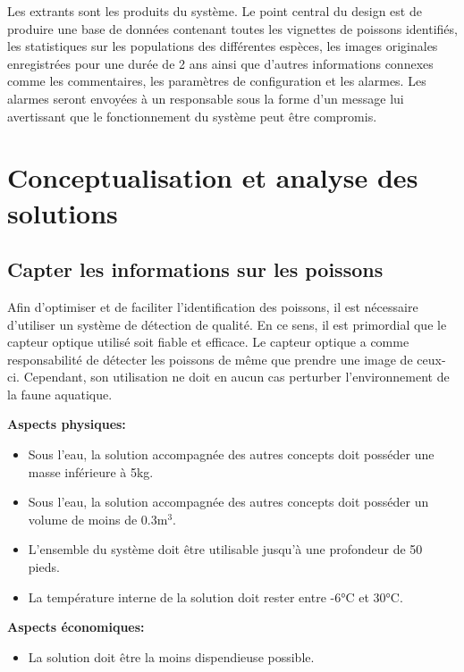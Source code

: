Les extrants sont les produits du système. Le point central du design est de produire une base de données contenant toutes les vignettes de poissons identifiés, les statistiques sur les populations des différentes espèces, les images originales enregistrées pour une durée de 2 ans ainsi que d'autres informations connexes comme les commentaires, les paramètres de configuration et les alarmes. Les alarmes seront envoyées à un responsable sous la forme d'un message lui avertissant que le fonctionnement du système peut être compromis.


\section{Conceptualisation et analyse des solutions}

\subsection{Capter les informations sur les poissons}

Afin d'optimiser et de faciliter l'identification des poissons, il est nécessaire d'utiliser un système de détection de qualité. En ce sens, il est primordial que le capteur optique utilisé soit fiable et efficace. Le capteur optique a comme responsabilité de détecter les poissons de même que prendre une image de ceux-ci. Cependant, son utilisation ne doit en aucun cas perturber l'environnement de la faune aquatique.


\textbf{Aspects physiques:}
\begin{itemize}[label = {--}]
    \item Sous l'eau, la solution accompagnée des autres concepts doit posséder une masse inférieure à 5kg.
    \item Sous l'eau, la solution accompagnée des autres concepts doit posséder un volume de moins de 0.3m$^3$.
    \item L'ensemble du système doit être utilisable jusqu'à une profondeur de 50 pieds.
    \item La température interne de la solution doit rester entre -6°C et 30°C.
\end{itemize}

\textbf{Aspects économiques:}
\begin{itemize}[label = {--}]
    \item La solution doit être la moins dispendieuse possible.
\end{itemize}


